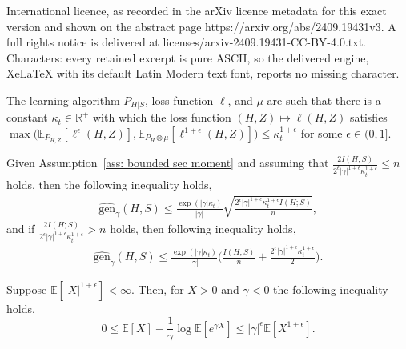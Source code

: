 \documentclass[10pt,a4paper]{amsart}
\newcommand{\mbE}{\mathbb{E}}
\begin{document}
International licence, as recorded in the arXiv licence metadata for this exact version and shown on the abstract page https://arxiv.org/abs/2409.19431v3. A full rights notice is delivered at licenses/arxiv-2409.19431-CC-BY-4.0.txt. Characters: every retained excerpt is pure ASCII, so the delivered engine, XeLaTeX with its default Latin Modern text font, reports no missing character.
\begin{assumption}\label{ass: bounded sec moment}
    The learning algorithm $P_{H|S}$, loss function $\ell$, and $\mu$ are such that there is a constant $\kappa_t\in\mathbb{R}^+$ with which the loss function $(H,Z)\mapsto\ell(H,Z)$ satisfies $\max\big(\mbE_{P_{H,Z}}[\ell^{\epsilon}(H,Z)],\mbE_{P_{H}\otimes \mu}[\ell^{1+\epsilon}(H,Z)]\big)\leq \kappa_t^{1+\epsilon}$ for some $\epsilon\in(0,1]$.
\end{assumption}

\begin{proposition}\label{prop: upper via Mutual V2 unbound}
Given Assumption~\ref{ass: bounded sec moment} and assuming that $\frac{2I(H;S)}{2^{\epsilon}|\gamma|^{1+\epsilon} \kappa_t^{1+\epsilon}}\leq n $ holds, then the following inequality holds,
\begin{equation*}
    \begin{split}
          \widehat{\mathrm{gen}}_{\gamma}(H,S)\leq  
            \frac{\exp(|\gamma| \kappa_t)}{|\gamma|} \sqrt{\frac{2^{\epsilon}|\gamma|^{1+\epsilon} \kappa_t^{1+\epsilon} I(H;S)}{n}},
    \end{split}
\end{equation*}
and if $\frac{2I(H;S)}{2^{\epsilon}|\gamma|^{1+\epsilon} \kappa_t^{1+\epsilon}}>n$ holds, then following inequality holds, 
\begin{equation*}
    \begin{split}
       \widehat{\mathrm{gen}}_{\gamma}(H,S)\leq  \frac{\exp(|\gamma| \kappa_t)}{ |\gamma|}\Big( \frac{ I(H;S)}{n}+\frac{2^{\epsilon}|\gamma|^{1+\epsilon} \kappa_t^{1+\epsilon}}{2}\Big).
    \end{split}
\end{equation*}
\end{proposition}

\begin{lemma}\label{lem:SE_vs_linear_epsilon}
    Suppose $\mbE[|X|^{1+\epsilon}] < \infty$. Then, for $X>0$ and $\gamma<0$ the following inequality holds,
\begin{equation*}
        0 \leq \mbE[X]- \frac{1}{\gamma} \log{\mbE[e^{\gamma X}]}  \leq  |\gamma|^{\epsilon}\mbE[X^{1+\epsilon}] .
    \end{equation*}
\end{lemma}
\end{document}
